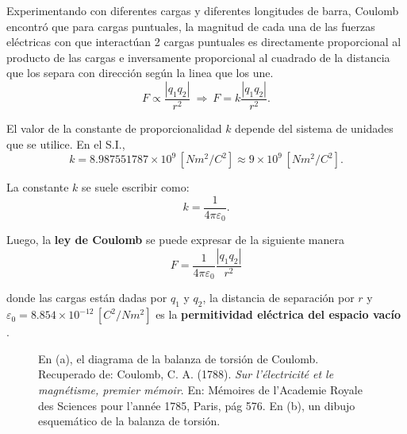 Experimentando con diferentes cargas y diferentes longitudes de barra, Coulomb encontró que para cargas puntuales, la magnitud de cada una de las fuerzas eléctricas con que interactúan 2 cargas puntuales es directamente proporcional al producto de las cargas e inversamente proporcional al cuadrado de la distancia que los separa con dirección según la linea que los une.
$$F \propto \frac{|q_1q_2|}{r^2} ~\Rightarrow ~ F = k \frac{|q_1q_2|}{r^2}.$$

El valor de la constante de proporcionalidad $k$ depende del sistema de unidades que se utilice. En el S.I.,
$$k = 8.987551787 \times 10^9 \,[Nm^2/C^2] \approx 9 \times 10^9 \, [Nm^2/C^2].$$

La constante $k$ se suele escribir como:
$$k = \frac{1}{4\pi \varepsilon_0}.$$

Luego, la \textbf{ley de Coulomb} se puede expresar de la siguiente manera
$$\boxed{F = \frac{1}{4\pi\varepsilon_0} \frac{|q_1q_2|}{r^2}}$$

donde las cargas están dadas por $q_1$ y $q_2$, la distancia de separación por $r$ y $\varepsilon_0 = 8.854 \times 10^{-12} \,[C^2/Nm^2]$ es la \textbf{permitividad eléctrica del espacio vacío} \cite{CODATA}.
\begin{figure}
        \centering
         \hspace{1cm}
        \caption{En (a), el diagrama de la balanza de torsión de Coulomb. Recuperado de: Coulomb, C. A. (1788). \textit{Sur l'électricité et le magnétisme, premier mémoir}. En: Mémoires de l'Academie Royale des Sciences pour l’année 1785, Paris, pág 576. En (b), un dibujo esquemático de la balanza de torsión.}
        \label{fig:Balanza-Torsion}
    \end{figure}


